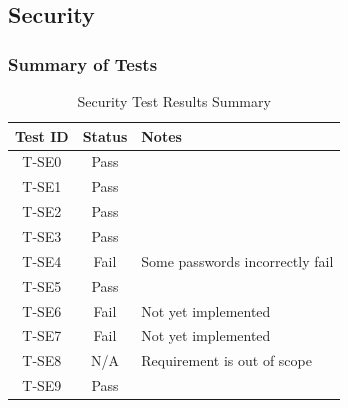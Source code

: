 \documentclass[12pt, titlepage]{article}
\begin{document}
\subsection{Security}
\subsubsection{Summary of Tests}
\begin{table}[H]
    \centering
    \begin{tabular}{|c|c|l|}
        \hline
        \textbf{Test ID} & \textbf{Status} & \textbf{Notes}\\
        \hline
        T-SE0 & Pass & \\
        T-SE1 & Pass & \\ 
        T-SE2 & Pass & \\ 
        T-SE3 & Pass & \\ 
        T-SE4 & Fail & Some passwords incorrectly fail\\ 
        T-SE5 & Pass & \\ 
        T-SE6 & Fail & Not yet implemented\\ 
        T-SE7 & Fail & Not yet implemented\\ 
        T-SE8 & N/A & Requirement is out of scope\\ 
        T-SE9 & Pass & \\ 
        \hline
    \end{tabular}
    \caption{Security Test Results Summary}
\end{table}
\end{document}
